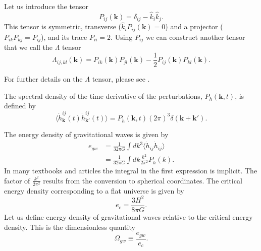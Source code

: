 Let us introduce the tensor
\cite[eq. 1.35]{maggiore_gw_2008}
\begin{equation}
P_{ij}(\bm{k}) = \delta_{ij} - \hat{k}_i \hat{k}_j.
\end{equation}
This tensor is symmetric, transverse ($\hat{k}_i P_{ij}(\bm{k}) = 0$) and a projector ($P_{ik}P_{kj} = P_{ij}$), and its trace $P_{ii} = 2$.
Using $P_{ij}$ we can construct another tensor that we call the $\Lambda$ tensor
\cite[eq. 1.36]{maggiore_gw_2008}
\begin{equation}
\Lambda_{ij,kl}(\bm{k}) = P_{ik}(\bm{k}) P_{jl}(\bm{k}) - \frac{1}{2} P_{ij}(\bm{k}) P_{kl}(\bm{k}).
\label{eq:Lambda}
\end{equation}
\iffalse
This is still a projector, in the sense that
\begin{equation}
\Lambda_{ij,kl} \Lambda_{kl,mn} = \Lambda_{ij,mn}.
\end{equation}
It is also transverse on all of its indices as $n^i \Lambda_{ij,kl} = 0$ for all indices ($ijkl$}.
It is traceless with respect to the ($i,j$) and ($k,l$) index pairs,
\begin{equation}
\Lambda_{ii,kl} = \Lambda_{ij,kk} = 0.
\end{equation}
\fi
For further details on the $\Lambda$ tensor, please see
\cite[ch. 1.2]{maggiore_gw_2008}.

The spectral density of the time derivative of the perturbations, $P_{\dot{h}}(\bm{k},t)$, is defined by
\cite[eq. 3.4]{hindmarsh_gw_pt_2019}
\begin{equation}
\langle \dot{h}_{\bm{k}}^{ij}(t) \dot{h}_{\bm{k}'}^{ij}(t) \rangle = P_{\dot{h}}(\bm{k},t) (2\pi)^3 \delta (\bm{k} + \bm{k}').
\label{eq:hbracket}
\end{equation}

The energy density of gravitational waves is given by
\cites[eq. 3.3]{hindmarsh_gw_pt_2019}[eq. 1.135, 7.193]{maggiore_gw_2008}
\begin{align}
e_{gw}
&= \frac{1}{32 \pi G} \int dk^3 \langle \dot{h}_{ij} \dot{h}_{ij} \rangle \\
&= \frac{1}{32 \pi G} \int dk \frac{k^2}{2 \pi^2} P_{\dot{h}}(k).
\end{align}
In many textbooks and articles the integral in the first expression is implicit.
The factor of $\frac{k^2}{2\pi^2}$ results from the conversion to spherical coordinates.
The critical energy density corresponding to a flat universe is given by
\cite[eq. 7.196]{maggiore_gw_2008}
\begin{equation}
e_c = \frac{3 H^2}{8 \pi G}.
\label{eq:e_crit}
\end{equation}
Let us define energy density of gravitational waves relative to the critical energy density.
This is the dimensionless quantity
\begin{equation}
\Omega_{gw} \equiv \frac{e_{gw}}{e_c}.
\label{eq:omega_gw}
\end{equation}

